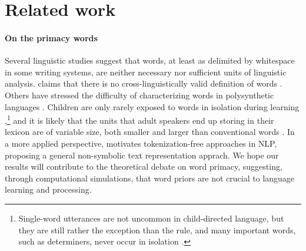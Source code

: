 \section{Related work}
\label{sec:related}

\paragraph{On the primacy words} Several linguistic studies suggest
that words, at least as delimited by whitespace in some writing
systems, are neither necessary nor sufficient units of linguistic
analysis.  claims that there is no
cross-linguistically valid definition of words \cite[see also][who
address specifically the notion of prosodic
word]{Schiering:etal:2010}. Others have stressed the difficulty of
characterizing words in polysynthetic languages
\cite{Bickel:Zuniga:2017}. Children are only rarely exposed to words
in isolation during learning
\cite{Tomasello:2003},\footnote{Single-word utterances are not
  uncommon in child-directed language, but they are still rather the
  exception than the rule, and many important words, such as
  determiners, never occur in isolation
  \cite{Christiansen:etal:2005}.} and it is likely that the units that
adult speakers end up storing in their lexicon are of variable size,
both smaller and larger than conventional words
\cite[e.g.,][]{Jackendoff:2002,Goldberg:2005}. In a more applied
perspective,  motivates tokenization-free
approaches in NLP, proposing a general non-symbolic text
representation apprach. %
We hope our results will contribute to the theoretical
debate on word primacy, suggesting, through computational simulations, that
word priors are not crucial to language learning and processing.

